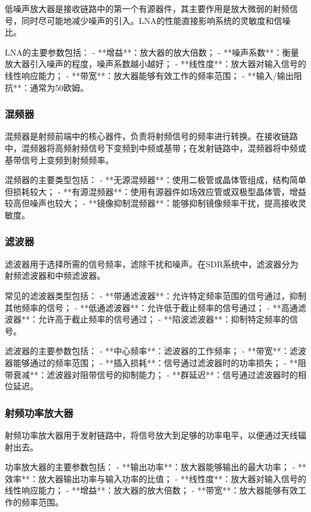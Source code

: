 ﻿\documentclass[UTF8]{ctexbook}
\begin{document}
低噪声放大器是接收链路中的第一个有源器件，其主要作用是放大微弱的射频信号，同时尽可能地减少噪声的引入。LNA的性能直接影响系统的灵敏度和信噪比。

LNA的主要参数包括：
- **增益**：放大器的放大倍数；
- **噪声系数**：衡量放大器引入噪声的程度，噪声系数越小越好；
- **线性度**：放大器对输入信号的线性响应能力；
- **带宽**：放大器能够有效工作的频率范围；
- **输入/输出阻抗**：通常为50欧姆。

\subsubsection{混频器}

混频器是射频前端中的核心器件，负责将射频信号的频率进行转换。在接收链路中，混频器将高频射频信号下变频到中频或基带；在发射链路中，混频器将中频或基带信号上变频到射频频率。

混频器的主要类型包括：
- **无源混频器**：使用二极管或晶体管组成，结构简单但损耗较大；
- **有源混频器**：使用有源器件如场效应管或双极型晶体管，增益较高但噪声也较大；
- **镜像抑制混频器**：能够抑制镜像频率干扰，提高接收灵敏度。

\subsubsection{滤波器}

滤波器用于选择所需的信号频率，滤除干扰和噪声。在SDR系统中，滤波器分为射频滤波器和中频滤波器。

常见的滤波器类型包括：
- **带通滤波器**：允许特定频率范围的信号通过，抑制其他频率的信号；
- **低通滤波器**：允许低于截止频率的信号通过；
- **高通滤波器**：允许高于截止频率的信号通过；
- **陷波滤波器**：抑制特定频率的信号。

滤波器的主要参数包括：
- **中心频率**：滤波器的工作频率；
- **带宽**：滤波器能够通过的频率范围；
- **插入损耗**：信号通过滤波器时的功率损失；
- **阻带衰减**：滤波器对阻带信号的抑制能力；
- **群延迟**：信号通过滤波器时的相位延迟。

\subsubsection{射频功率放大器}

射频功率放大器用于发射链路中，将信号放大到足够的功率电平，以便通过天线辐射出去。

功率放大器的主要参数包括：
- **输出功率**：放大器能够输出的最大功率；
- **效率**：放大器输出功率与输入功率的比值；
- **线性度**：放大器对输入信号的线性响应能力；
- **增益**：放大器的放大倍数；
- **带宽**：放大器能够有效工作的频率范围。
\end{document}
